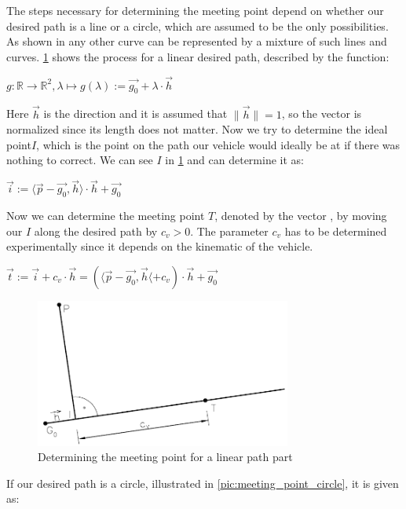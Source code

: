 The steps necessary for determining the meeting point depend on whether our desired path is a line or a circle, which are assumed to be the only possibilities. As shown in \cite{12} any other curve can be represented by a mixture of such lines and curves.
\ref{pic:meeting_point_linear} shows the process for a linear desired path, described by the function:
\begin{center}
$g:\mathbb{R} \to \mathbb{R}^2 , \lambda \mapsto g(\lambda ) := \vec{g_0} + \lambda \cdot \vec{h}$
\end{center}
Here $\vec{h}$ is the direction and it is assumed that $\|\vec{h}\|=1$, so the vector is normalized since its length does not matter. Now we try to determine the ideal point$I$, which is the point on the path our vehicle would ideally be at if there was nothing to correct. We can see $I$ in \ref{pic:meeting_point_linear} and can determine it as:
\begin{center}
$\vec{i}:= \langle \vec{p}-\vec{g_0}, \vec{h} \rangle \cdot \vec{h} + \vec{g_0}$
\end{center}
Now we can determine the meeting point $T$, denoted by the vector , by moving our $I$ along the desired path by $c_v>0$. The parameter $c_v$ has to be determined experimentally since it depends on the kinematic of the vehicle.
\begin{center}
$\vec{t}:=\vec{i}+c_v \cdot \vec{h} = ( \langle \vec{p} - \vec{g_0}, \vec{h} \langle + c_v) \cdot \vec{h} + \vec{g_0}$
\end{center}

\begin{figure}[h]
\centering
\includegraphics[width=0.75\textwidth]{./Chapters/Figures/meeting_point_linear.png}
\caption{Determining the meeting point for a linear path part\label{pic:meeting_point_linear}}
\end{figure}

If our desired path is a circle, illustrated in \ref{pic:meeting_point_circle}, it is given as:

